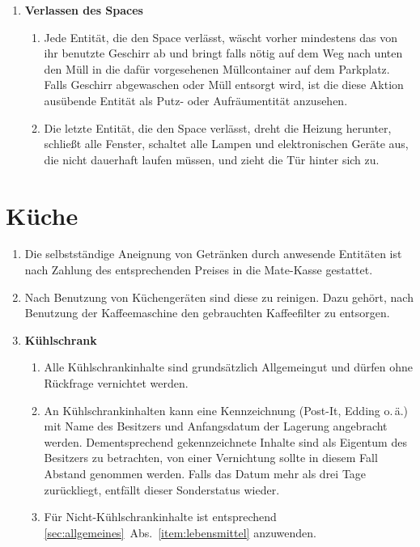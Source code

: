 \documentclass[12pt,a4paper]{scrartcl}
\begin{document}
\begin{enumerate}
  \item\textbf{Verlassen des Spaces}\begin{enumerate}
    \item Jede Entität, die den Space verlässt, wäscht vorher mindestens das von
      ihr benutzte Geschirr ab und bringt falls nötig auf dem Weg nach unten den
      Müll in die dafür vorgesehenen Müllcontainer auf dem Parkplatz. Falls
      Geschirr abgewaschen oder Müll entsorgt wird, ist die diese Aktion
      ausübende Entität als Putz- oder Aufräumentität anzusehen.
    \item Die letzte Entität, die den Space verlässt, dreht die Heizung
      herunter, schließt alle Fenster, schaltet alle Lampen und elektronischen
      Geräte aus, die nicht dauerhaft laufen müssen, und zieht die Tür hinter
      sich zu.
  \end{enumerate}
\end{enumerate}

\section{Küche}
\begin{enumerate}
  \item Die selbstständige Aneignung von Getränken durch anwesende Entitäten ist
    nach Zahlung des entsprechenden Preises in die Mate-Kasse gestattet.
  \item Nach Benutzung von Küchengeräten sind diese zu reinigen. Dazu gehört,
    nach Benutzung der Kaffeemaschine den gebrauchten Kaffeefilter zu entsorgen.
  \item\textbf{Kühlschrank}\begin{enumerate}
    \item Alle Kühlschrankinhalte sind grundsätzlich Allgemeingut und dürfen
      ohne Rückfrage vernichtet werden.
    \item An Kühlschrankinhalten kann eine Kennzeichnung (Post-It, Edding
      o.\,ä.) mit Name des Besitzers und Anfangsdatum der Lagerung
      angebracht werden. Dementsprechend gekennzeichnete Inhalte sind als
      Eigentum des Besitzers zu betrachten, von einer Vernichtung sollte in
      diesem Fall Abstand genommen werden. Falls das Datum mehr als drei Tage
      zurückliegt, entfällt dieser Sonderstatus wieder.
    \item Für Nicht-Kühlschrankinhalte ist entsprechend
      \ref{sec:allgemeines}~Abs.~\ref{item:lebensmittel} anzuwenden.
  \end{enumerate}
\end{enumerate}
\end{document}
